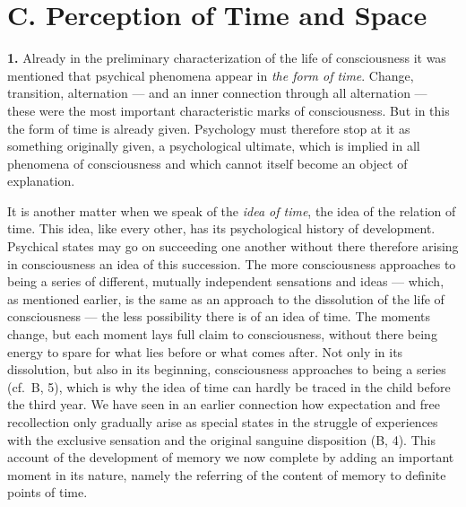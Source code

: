 \documentclass[12pt,a4paper]{book}
\newcommand{\opage}[1]{\marginnote{\footnotesize\textit{[#1]}}}
\begin{document}
\section*{C. Perception of Time and Space}

\textbf{1.} Already in the preliminary characterization of the life of
consciousness it was mentioned that psychical phenomena appear
\opage{227}in \emph{the form of time}. Change, transition, alternation ---
and an inner connection through all alternation --- these were the most
important characteristic marks of consciousness. But in this the form of
time is already given. Psychology must therefore stop at it as something
originally given, a psychological ultimate, which is implied in all
phenomena of consciousness and which cannot itself become an object of
explanation.

It is another matter when we speak of the \emph{idea of time}, the idea
of the relation of time. This idea, like every other, has its
psychological history of development. Psychical states may go on
succeeding one another without there therefore arising in consciousness
an idea of this succession. The more consciousness approaches to being a
series of different, mutually independent sensations and ideas --- which,
as mentioned earlier, is the same as an approach to the dissolution of
the life of consciousness --- the less possibility there is of an idea of
time. The moments change, but each moment lays full claim to
consciousness, without there being energy to spare for what lies before
or what comes after. Not only in its dissolution, but also in its
beginning, consciousness approaches to being a series (cf.\ B, 5), which
is why the idea of time can hardly be traced in the child before the
third year. We have seen in an earlier connection how expectation and
free recollection only gradually arise as special states in the struggle
of experiences with the exclusive sensation and the original sanguine
disposition (B, 4). This account of the development of memory we now
complete by adding an important moment in its nature, namely the
referring of the content of memory to definite points of time.
\end{document}
